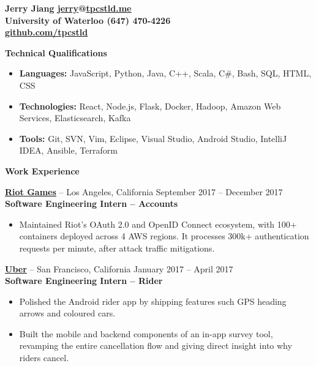 \documentclass{letter}
\begin{document}
  \thispagestyle{empty}


{\bfseries
  {\Large Jerry Jiang} \hfill \href{mailto:jerry@tpcstld.me}{\uline{jerry}}@\href{http://tpcstld.me}{\uline{tpcstld.me}} \\
  University of Waterloo \hfill (647) 470-4226 \\
\null \hfill \href{https://github.com/tpcstld}{\uline{github.com/tpcstld}}}

{\bfseries \Large Technical Qualifications}

\vspace{-10mm}
\null\hrulefill

\vspace{-3mm}
\begin{itemize}
    \item {\bfseries Languages:}
        JavaScript, Python, Java, C++, Scala, C\#, Bash, SQL, HTML, CSS
    \item {\bfseries Technologies:}
        React, Node.js, Flask, Docker, Hadoop, Amazon Web Services,
        Elasticsearch, Kafka
    \item {\bfseries Tools:}
        Git, SVN, Vim, Eclipse, Visual Studio, Android Studio, IntelliJ IDEA,
        Ansible, Terraform
\end{itemize}

{\bfseries \Large Work Experience}

\vspace{-10mm}
\null\hrulefill

\vspace{-1.5mm}
{\bfseries \href{http://riotgames.com}{\uline{Riot Games}}} -- Los Angeles,
California \hfill September 2017 -- December 2017\\
{\bfseries Software Engineering Intern -- Accounts}
\vspace{-3mm}
\begin{itemize}
    \item Maintained Riot's OAuth 2.0 and OpenID Connect ecosystem, with 100+
      containers deployed across 4 AWS regions. It processes 300k+
      authentication requests per minute, after attack traffic mitigations.
\end{itemize}

\vspace{-1.5mm}
{\bfseries \href{http://uber.com}{\uline{Uber}}} -- San Francisco,
California \hfill January 2017 -- April 2017\\
{\bfseries Software Engineering Intern -- Rider}
\vspace{-3mm}
\begin{itemize}
    \item Polished the Android rider app by shipping features such
      GPS heading arrows and coloured cars.
    \item Built the mobile and backend components of an in-app survey tool,
      revamping the entire cancellation flow and giving direct insight into
      why riders cancel.
\end{itemize}
\end{document}
